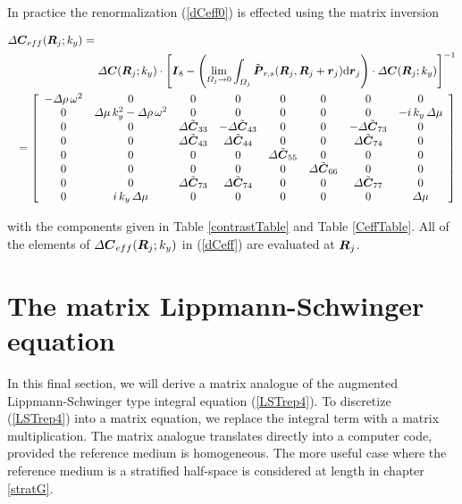 In practice the renormalization (\ref{dCeff0}) is 
effected using the matrix inversion
\begin{samepage}
\begin{eqnarray}  \label{dCeff}
\lefteqn{{\mit \Delta}{\bmi C}_{eff}({\bmi 
R}_j;k_y)=
}\\
&&
{\mit \Delta}{\bmi C}({\bmi 
R}_j;k_y)\cdot\left[ {\bmi I}_8 - \left(\lim\limits_{{\mit \Omega }_{j} \rightarrow   
0}\int_{{\mit \Omega }_{j}}{\tilde{\bmi  P}_{r,s}}
({\bmi R}_j,{\bmi  R}_j+{\bmi  r}_j){\rm d}{\bmi r}_j\right) \cdot{\mit \Delta}{\bmi C}({\bmi 
R}_j;k_y) \right]^{-1}\nonumber\\
&&
=\left[\begin{array}{cccccccc}
 -{\mit \Delta \rho}\,{\omega^2} &0&0&0&0&0&0&0\\
 0&{\mit \Delta}\mu\,{k_{y}^2} - {\mit \Delta} \rho\,{\omega^2} &0&0&0&0&0&
 -i\,{  k_y}\,{\mit \Delta \mu}\\
 0&0&{\mit \Delta}\tilde{\bmi C}_{33}&-{\mit \Delta}\tilde{\bmi C}_{43}&0&0&-{\mit \Delta}\tilde{\bmi C}_{73}&0\\
 0&0&{\mit \Delta}\tilde{\bmi C}_{43}&{\mit \Delta}\tilde{\bmi C}_{44}&0&0&{\mit \Delta}\tilde{\bmi C}_{74}&0\\
 0&0&0&0&{\mit \Delta}\tilde{\bmi C}_{55}&0&0&0\\
 0&0&0&0&0&{\mit \Delta}\tilde{\bmi C}_{66}&0&0\\
 0&0&{\mit \Delta}\tilde{\bmi C}_{73}&{\mit \Delta}\tilde{\bmi C}_{74}&0&0&{\mit \Delta}\tilde{\bmi C}_{77}&0\\
 0&i\,{  k_y}\,{\mit \Delta \mu}&0&0&0&0&0&{\mit \Delta \mu}
  \end{array}\right]\nonumber
\end{eqnarray}
\end{samepage}
with the components given in Table \ref{contrastTable} and 
Table \ref{CeffTable}. All of the elements of ${\mit \Delta}{\mbox{\boldmath$\mit C$\unboldmath}}_{eff}({\mbox{\boldmath$\mit R$\unboldmath}}_j;k_y)$ in (\ref{dCeff}) are evaluated at ${\mbox{\boldmath$\mit R$\unboldmath}}_j$. 


\section{The matrix Lippmann-Schwinger equation}
In this final section, we will derive a matrix analogue of the augmented 
Lippmann-Schwinger type integral equation (\ref{LSTrep4}). 
To discretize (\ref{LSTrep4}) into a matrix equation, we replace the 
integral term with a matrix multiplication.  
 The matrix analogue translates directly into a computer code, provided the reference 
medium is homogeneous. The more useful case where the reference medium is 
a stratified half-space is considered at length in chapter \ref{stratG}.

